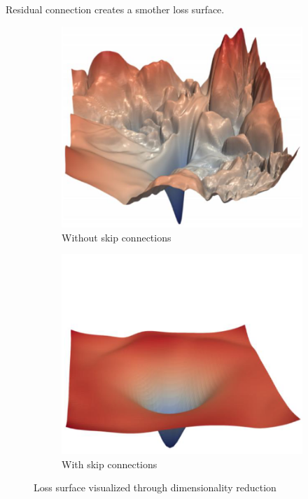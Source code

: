 \begin{remark}
    Residual connection creates a smother loss surface.
    \begin{figure}[H]
        \centering
        \begin{subfigure}{0.3\linewidth}
            \centering
            \includegraphics[width=0.7\linewidth]{./img/resnet_loss1.png}        
            \caption{Without skip connections}
        \end{subfigure}
        \begin{subfigure}{0.3\linewidth}
            \centering
            \includegraphics[width=0.7\linewidth]{./img/resnet_loss2.png}        
            \caption{With skip connections}
        \end{subfigure}
        \caption{Loss surface visualized through dimensionality reduction}
    \end{figure}
\end{remark}

